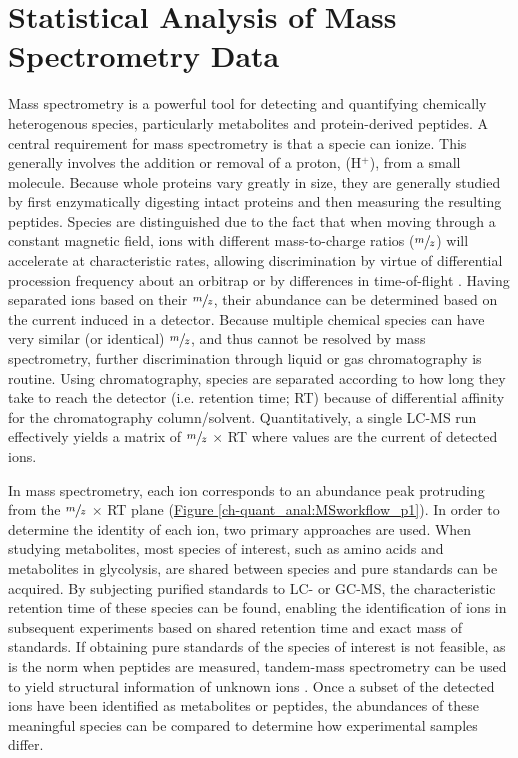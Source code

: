 
\chapter{Statistical Analysis of Mass Spectrometry Data\label{ch:quant_anal}}

Mass spectrometry is a powerful tool for detecting and quantifying chemically heterogenous species, particularly metabolites and protein-derived peptides. A central requirement for mass spectrometry is that a specie can ionize. This generally involves the addition or removal of a proton, (H$^{+}$), from a small molecule. Because whole proteins vary greatly in size, they are generally studied by first enzymatically digesting intact proteins and then measuring the resulting peptides. Species are distinguished due to the fact that when moving through a constant magnetic field, ions with different mass-to-charge ratios ($\sfrac{m}{z}$) will accelerate at characteristic rates, allowing discrimination by virtue of differential procession frequency about an orbitrap or by differences in time-of-flight \cite{Boyd:2011vt}. Having separated ions based on their $\sfrac{m}{z}$, their abundance can be determined based on the current induced in a detector.  Because multiple chemical species can have very similar (or identical) $\sfrac{m}{z}$, and thus cannot be resolved by mass spectrometry, further discrimination through liquid or gas chromatography is routine.  Using chromatography, species are separated according to how long they take to reach the detector (i.e. retention time; RT) because of differential affinity for the chromatography column/solvent. Quantitatively, a single LC-MS run effectively yields a matrix of $\sfrac{m}{z}$ $\times$ RT where values are the current of detected ions.  

In mass spectrometry, each ion corresponds to an abundance peak protruding from the $\sfrac{m}{z}$ $\times$ RT plane (\hyperref[ch-quant_anal:MSworkflow_p1]{Figure \ref{ch-quant_anal:MSworkflow_p1}}). In order to determine the identity of each ion, two primary approaches are used.  When studying metabolites, most species of interest, such as amino acids and metabolites in glycolysis, are shared between species and pure standards can be acquired.  By subjecting purified standards to LC- or GC-MS, the characteristic retention time of these species can be found, enabling the identification of ions in subsequent experiments based on shared retention time and exact mass of standards.  If obtaining pure standards of the species of interest is not feasible, as is the norm when peptides are measured, tandem-mass spectrometry can be used to yield structural information of unknown ions \cite{Nesvizhskii:2005jp, Huang:2012tl}.  Once a subset of the detected ions have been identified as metabolites or peptides, the abundances of these meaningful species can be compared to determine how experimental samples differ.


